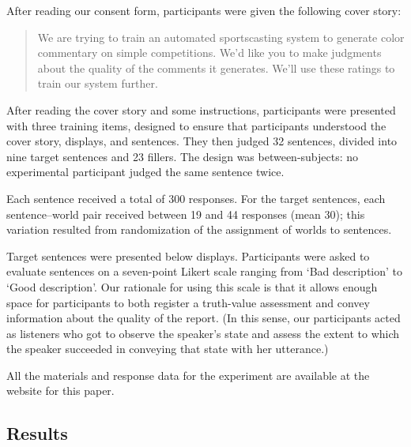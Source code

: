 \documentclass[leqno,12pt]{article}
\begin{document}
After reading our consent form, participants were given the following
cover story:

\begin{quote}
  We are trying to train an automated sportscasting system to generate
  color commentary on simple competitions. We'd like you to make
  judgments about the quality of the comments it generates. We'll use
  these ratings to train our system further.
\end{quote}

After reading the cover story and some instructions, participants were
presented with three training items, designed to ensure that participants
understood the cover story, displays, and sentences. They then judged 32
sentences, divided into nine target sentences and 23 fillers. The
design was between-subjects: no experimental participant judged the same sentence twice. 
 
Each sentence received a total of 300 responses. For the target
sentences, each sentence--world pair received between 19 and 44
responses (mean 30); this variation resulted from randomization of the
assignment of worlds to sentences.

Target sentences were presented below displays. Participants were
asked to evaluate sentences on a seven-point Likert scale ranging from
`Bad description' to `Good description'. Our rationale for using this
scale is that it allows enough space for participants to both register
a truth-value assessment and convey information about the quality of
the report. (In this sense, our participants acted as listeners who
got to observe the speaker's state and assess the extent to which the
speaker succeeded in conveying that state with her utterance.)

All the materials and response data for the experiment are available at
the website for this paper.


\subsection{Results}\label{sec:exp1:results}
\end{document}
